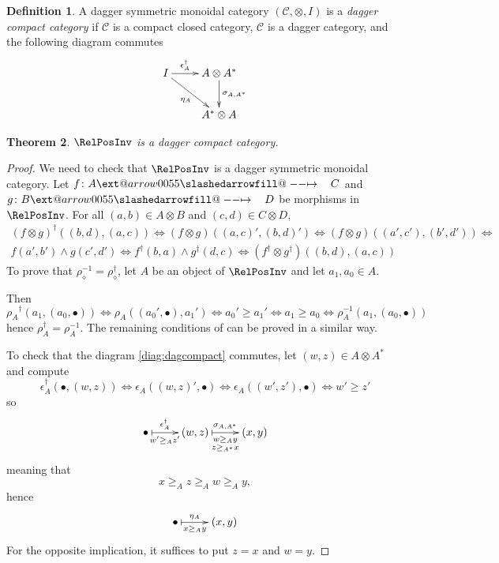 \documentclass{article}
\makeatletter
\newtheorem{theorem}{Theorem}[section]
\theoremstyle{definition}
\newtheorem{definition}[theorem]{Definition}
\newcommand{\C}{\mathcal{C}}
\newcommand{\ladj}[1]{{#1}_\diamond}
\newcommand{\sto}{\xslashedrightarrow{\hskip 1pc}}
\newcommand{\reldesc}[3]{\ar@{|->}[#1]^-{#2}_-{#3}}
\def\slashedarrowfill@#1#2#3#4#5{%
  $\m@th\thickmuskip0mu\medmuskip\thickmuskip\thinmuskip\thickmuskip
  \relax#5#1\mkern-7mu%
  \cleaders\hbox{$#5\mkern-2mu#2\mkern-2mu$}\hfill
  \mathclap{#3}\mathclap{#2}%
  \cleaders\hbox{$#5\mkern-2mu#2\mkern-2mu$}\hfill
  \mkern-7mu#4$%
}
\def\rightslashedarrowfill@{%
  \slashedarrowfill@\relbar\relbar\mapstochar\rightarrow}
\newcommand\xslashedrightarrow[2][]{%
  \ext@arrow 0055{\rightslashedarrowfill@}{#1}{#2}}
\makeatother
\begin{document}
\begin{definition}
A dagger symmetric monoidal category $(\C,\otimes,I)$ is a {\em dagger compact category} if
 $\C$ is a compact closed category, $\C$ is a dagger category, and
the following diagram commutes
\begin{equation}
\label{diag:dagcompact}
\xymatrix{
I
	\ar[r]^-{\epsilon_A^{\dag}}
	\ar[rd]_{\eta_A}
&
A\otimes A^*
	\ar[d]^{\sigma_{A,A^*}}
\\
~
&
A^*\otimes A
}
\end{equation}

\end{definition}
\begin{theorem}
$\RelPosInv$ is a dagger compact category.
\end{theorem}
\begin{proof}

We need to check that $\RelPosInv$ is a dagger symmetric monoidal category. Let 
$f\colon A\sto C$ and $g\colon B\sto D$ be morphisms
in $\RelPosInv$.
 For all $(a,b)\in A\otimes B$ and
$(c,d)\in C\otimes D$,
\begin{multline*}
(f\otimes g)^\dag((b,d),(a,c))\Leftrightarrow
(f\otimes g)((a,c)',(b,d)')\Leftrightarrow
(f\otimes g)((a',c'),(b',d'))\Leftrightarrow\\
f(a',b')\wedge g(c',d')\Leftrightarrow
f^\dag(b,a)\wedge g^\dag(d,c)\Leftrightarrow
(f^\dag\otimes g^\dag)((b,d),(a,c))
\end{multline*}
To prove that $\ladj\rho^{-1}=\ladj\rho^\dag$, let $A$ be an object of $\RelPosInv$
and let $a_1,a_0\in A$. 

Then
$$
{\rho_A}^\dag(a_1,(a_0,\bullet))\Leftrightarrow\rho_A((a_0',\bullet),a_1')
\Leftrightarrow a_0'\geq a_1'\Leftrightarrow a_1\geq a_0\Leftrightarrow
\rho_A^{-1}(a_1,(a_0,\bullet))
$$
hence $\rho_A^\dag=\rho_A^{-1}$.
The remaining conditions of 
can be proved in a similar way.

To check that the diagram \eqref{diag:dagcompact} commutes, let
$(w,z)\in A\otimes A^*$ and compute
$$
\epsilon_A^\dag(\bullet,(w,z))\Leftrightarrow\epsilon_A((w,z)',\bullet)\Leftrightarrow\epsilon_A((w',z'),\bullet)
\Leftrightarrow w'\geq z'
$$
so
$$
\xymatrix{
\bullet
	\reldesc{r}{\epsilon_A^\dag}{w'\geq_A z'}
&
(w,z)
	\reldesc{r}{\sigma_{A,A^*}}{\substack{{w\geq_A y}\\{z\geq_{A^*} x}}}
&
(x,y)
}
$$
meaning that
$$
x\geq_A z\geq_A w\geq_A y,
$$
hence
$$
\xymatrix {
\bullet
	\reldesc{r}{\eta_A}{x\geq_A y}
&
(x,y)
}
$$
For the opposite implication, it suffices to put $z=x$ and $w=y$.
\end{proof}
\end{document}
